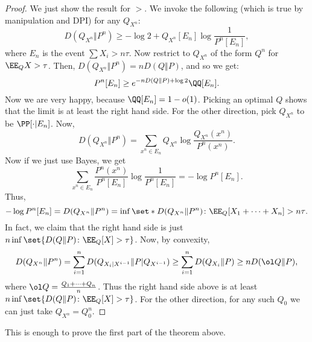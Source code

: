 \begin{proof}
	We just show the result for $>$.
	We invoke the following (which is true by manipulation and DPI) for any $Q_{X^n}$: \[
		D(Q_{X^n}\Vert P^n) \geq -\log 2 + Q_{X^n}[E_n] \log \frac{1}{P^n[E_n]},
	\]where $E_n$ is the event $\sum X_i > n\tau$.
	Now restrict to $Q_{X^n}$ of the form $Q^n$ for $\EE_Q X > \tau$.
	Then, $D(Q_{X^n} \Vert P^n) = nD(Q\Vert P)$, and so we get: \[
		P^n[E_n] \geq e^{-nD(Q\Vert P) + \log 2}{\QQ[E_n]}.
	\]
	Now we are very happy, because $\QQ[E_n] = 1-o(1)$. Picking an optimal $Q$ shows that the limit is at least the right hand side.
	For the other direction, pick $Q_{X^n}$ to be $\PP[\cdot |E_n]$.
	Now, \[
		D(Q_{X^n}\Vert P^n) = \sum_{x^n\in E_n} Q_{X^n} \log \frac{Q_{X^n}(x^n)}{P^n(x^n)}.
	\]
	Now if we just use Bayes, we get \[
		\sum_{x^n\in E_n} \frac{P^n(x^n)}{P^n[E_n]} \log \frac{1}{P^n[E_n]} = -\log P^n[E_n].
	\]
	Thus, \[
		-\log P^n[E_n] = D(Q_{X^n} \Vert P^n) = \inf \set*{D(Q_{X^n}\Vert P^n) \colon \EE_Q [X_1+\cdots + X_n] > n\tau}.
	\]
	In fact, we claim that the right hand side is just $n\inf\set{D(Q\Vert P) \colon \EE_Q[X] > \tau}$.
	Now, by convexity, \[
		D(Q_{X^n}\Vert P^n) = \sum_{i=1}^n D(Q_{X_i|X^{i-1}} \Vert P | Q_{X^{i-1}}) \geq \sum_{i=1}^n D(Q_{X_i} \Vert P)  \geq n D(\ol Q \Vert P),
	\]
	where $\ol Q = \frac{Q_1 + \cdots + Q_n}{n}$.
	Thus the right hand side above is at least $n\inf \set{D(Q\Vert P)\colon \EE_Q[X] > \tau}$. For the other direction, for any such $Q_0$ we can just take $Q_{X^n} = Q_0^n$.
\end{proof}

This is enough to prove the first part of the theorem above.

